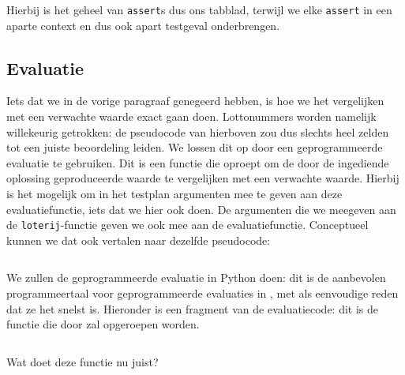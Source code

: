 \inputminted{python}{code/lotto-eval.py}

Hierbij is het geheel van \texttt{assert}s dus ons tabblad, terwijl we elke \texttt{assert} in een aparte context en dus ook apart testgeval onderbrengen.

\subsection{Evaluatie}\label{subsec:oefening-lotto-evaluatie}

Iets dat we in de vorige paragraaf genegeerd hebben, is hoe we het vergelijken met een verwachte waarde exact gaan doen.
Lottonummers worden namelijk willekeurig getrokken: de pseudocode van hierboven zou dus slechts heel zelden tot een juiste beoordeling leiden.
We lossen dit op door een geprogrammeerde evaluatie te gebruiken.
Dit is een functie die \tested{} oproept om de door de ingediende oplossing geproduceerde waarde te vergelijken met een verwachte waarde.
Hierbij is het mogelijk om in het testplan argumenten mee te geven aan deze evaluatiefunctie, iets dat we hier ook doen.
De argumenten die we meegeven aan de \texttt{loterij}-functie geven we ook mee aan de evaluatiefunctie.
Conceptueel kunnen we dat ook vertalen naar dezelfde pseudocode:

\inputminted{python}{code/lotto-eval-programmed.py}

We zullen de geprogrammeerde evaluatie in Python doen: dit is de aanbevolen programmeertaal voor geprogrammeerde evaluaties in \tested{}, met als eenvoudige reden dat ze het snelst is.
Hieronder is een fragment van de evaluatiecode: dit is de functie die door \tested{} zal opgeroepen worden.

\inputminted[firstline=42,lastline=48]{python}{sources/lotto-evaluator.py}

Wat doet deze functie nu juist?

